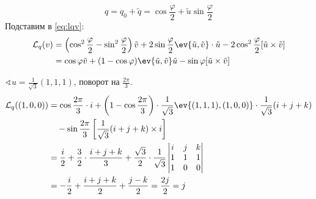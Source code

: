 \[q = q_0 + \tilde{q} = \cos \frac{\varphi}{2} + \tilde{u} \sin \frac{\varphi}{2}\]
Подставим в \eqref{eq:lqv}:
\begin{align*}
	\mathcal{L}_q(v)
	 & = \left(\cos^2 \frac{\varphi}{2} - \sin^2 \frac{\varphi}{2}\right) \tilde{v} + 2 \sin \frac{\varphi}{2} \ev{\tilde{u}, \tilde{v}}\cdot \tilde{u} - 2 \cos^2 \frac{\varphi}{2} [\tilde{u} \times \tilde{v}] \\
	 & = \cos \varphi \tilde{v} + (1 - \cos\varphi) \ev{\tilde{u}, \tilde{v}} \tilde{u} - \sin\varphi [\tilde{u} \times \tilde{v}]
\end{align*}

\begin{example}
	\(\sphericalangle u = \frac{1}{\sqrt{3}}(1, 1, 1)\), поворот на \(\frac{2\pi}{3}\).
	\begin{align*}
		\mathcal{L}_q((1, 0, 0))
		 & = \cos \frac{2\pi}{3} \cdot i + \left(1 - \cos \frac{2\pi}{3}\right)
		\cdot \frac{1}{\sqrt{3}} \ev{(1, 1, 1), (1, 0, 0)}
		\cdot \frac{1}{\sqrt{3}}(i+j+k)                                                                                       \\
		 & \quad - \sin \frac{2\pi}{3} \left[\frac{1}{\sqrt{3}} (i + j + k) \times i\right]                                   \\
		 & = \frac{i}{2} + \frac{3}{2} \cdot \frac{i + j + k}{3} + \frac{\sqrt{3}}{2} \cdot \frac{1}{\sqrt{3}} \begin{vmatrix}
			                                                                                                       i & j & k \\
			                                                                                                       1 & 1 & 1 \\
			                                                                                                       1 & 0 & 0
		                                                                                                       \end{vmatrix} \\
		 & = -\frac{i}{2} + \frac{i + j + k}{2} + \frac{j - k}{2} = \frac{2j}{2} = j
	\end{align*}
\end{example}

